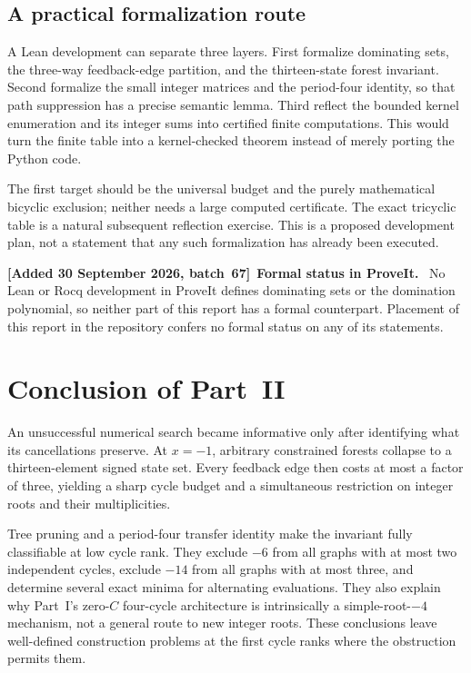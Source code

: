 \documentclass[11pt]{article}
\numberwithin{equation}{section}
\theoremstyle{definition}
\newenvironment{writenote}[1][]{\par\smallskip\begingroup\small\sloppy
 \noindent\textbf{[Added 30 September 2026, batch~67]}\if\relax\detokenize{#1}\relax\else~\textbf{#1.}\fi\ }%
 {\par\endgroup\smallskip}
\begin{document}
\subsection{A practical formalization route}
A Lean development can separate three layers. First formalize dominating
sets, the three-way feedback-edge partition, and the thirteen-state
forest invariant. Second formalize the small integer matrices and the
period-four identity, so that path suppression has a precise semantic
lemma. Third reflect the bounded kernel enumeration and its integer sums
into certified finite computations. This would turn the finite table into
a kernel-checked theorem instead of merely porting the Python code.

The first target should be the universal budget and the purely mathematical
bicyclic exclusion; neither needs a large computed certificate. The exact
tricyclic table is a natural subsequent reflection exercise. This is a
proposed development plan, not a statement that any such formalization
has already been executed.

\begin{writenote}[Formal status in ProveIt]
No Lean or Rocq development in ProveIt defines dominating sets or the
domination polynomial, so neither part of this report has a formal
counterpart. Placement of this report in the repository confers no formal
status on any of its statements.
\end{writenote}

\section{Conclusion of Part~II}
An unsuccessful numerical search became informative only after identifying
what its cancellations preserve. At $x=-1$, arbitrary constrained forests
collapse to a thirteen-element signed state set. Every feedback edge then
costs at most a factor of three, yielding a sharp cycle budget and a
simultaneous restriction on integer roots and their multiplicities.

Tree pruning and a period-four transfer identity make the invariant fully
classifiable at low cycle rank. They exclude $-6$ from all graphs with at
most two independent cycles, exclude $-14$ from all graphs with at most
three, and determine several exact minima for alternating evaluations.
They also explain why Part~I's zero-$C$ four-cycle architecture
is intrinsically a simple-root-$-4$ mechanism, not a general route to new
integer roots. These conclusions leave well-defined construction problems
at the first cycle ranks where the obstruction permits them.
\end{document}
